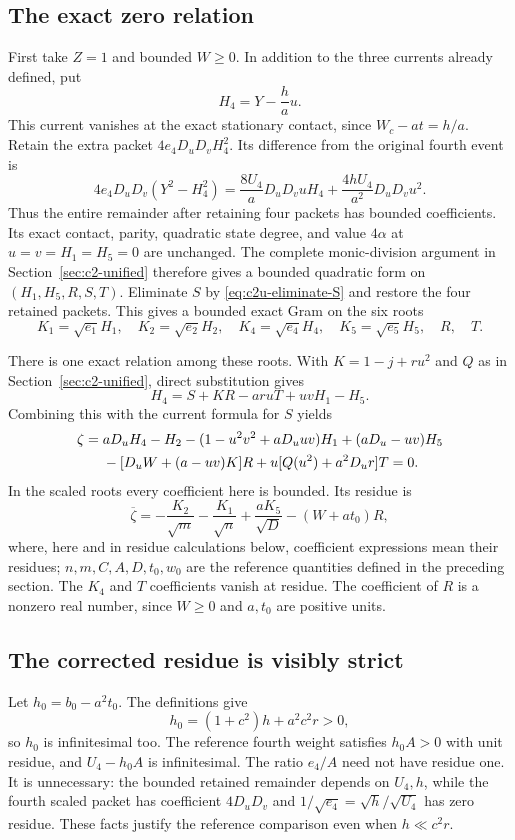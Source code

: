 \subsection{The exact zero relation}
First take $Z=1$ and bounded $W\geq0$.  In addition to the three currents
already defined, put
\[
H_4=Y-\frac ha u.
\]
This current vanishes at the exact stationary contact, since
$W_c-at=h/a$.  Retain the extra packet $4e_4D_uD_vH_4^2$.
Its difference from the original fourth event is
\[
4e_4D_uD_v(Y^2-H_4^2)
=\frac{8U_4}{a}D_uD_vuH_4+
\frac{4hU_4}{a^2}D_uD_vu^2.
\]
Thus the entire remainder after retaining four packets has bounded
coefficients.  Its exact contact, parity, quadratic state degree, and
value $4\alpha$ at $u=v=H_1=H_5=0$ are unchanged.  The complete
monic-division argument in Section~\ref{sec:c2-unified} therefore gives
a bounded quadratic form on $(H_1,H_5,R,S,T)$.  Eliminate $S$ by
\eqref{eq:c2u-eliminate-S} and restore the four retained packets.  This
gives a bounded exact Gram on the six roots
\begin{equation}
K_1=\sqrt{e_1}H_1,\quad K_2=\sqrt{e_2}H_2,\quad
K_4=\sqrt{e_4}H_4,\quad K_5=\sqrt{e_5}H_5,\quad R,\quad T.
\label{eq:c2y-roots}
\end{equation}

There is one exact relation among these roots.  With
$K=1-j+ru^2$ and $Q$ as in Section~\ref{sec:c2-unified}, direct
substitution gives
\[
H_4=S+KR-ar uT+uvH_1-H_5.
\]
Combining this with the current formula for $S$ yields
\begin{align}
\zeta={}&aD_uH_4-H_2-(1-u^2v^2+aD_uuv)H_1
 +(aD_u-uv)H_5\notag\\
&-[D_uW+(a-uv)K]R+u[Q(u^2)+a^2D_ur]T=0.
\label{eq:c2y-zero-relation}
\end{align}
In the scaled roots every coefficient here is bounded.  Its residue is
\begin{equation}
\overline\zeta=-\frac{K_2}{\sqrt m}-\frac{K_1}{\sqrt n}
+\frac{aK_5}{\sqrt D}-(W+at_0)R,
\label{eq:c2y-zero-residue}
\end{equation}
where, here and in residue calculations below, coefficient expressions
mean their residues; $n,m,C,A,D,t_0,w_0$ are the reference quantities
defined in the preceding section.  The $K_4$ and $T$ coefficients
vanish at residue.  The coefficient of $R$ is a nonzero real number,
since $W\geq0$ and $a,t_0$ are positive units.

\subsection{The corrected residue is visibly strict}
Let $h_0=b_0-a^2t_0$.  The definitions give
\begin{equation}
h_0=(1+c^2)h+a^2c^2r>0,
\label{eq:c2y-h0}
\end{equation}
so $h_0$ is infinitesimal too.  The reference fourth weight satisfies
$h_0A>0$ with unit residue, and $U_4-h_0A$ is infinitesimal.
The ratio $e_4/A$ need not have residue one.  It is unnecessary:
the bounded retained remainder depends on $U_4,h$, while the fourth
scaled packet has coefficient $4D_uD_v$ and
$1/\sqrt{e_4}=\sqrt h/\sqrt{U_4}$ has zero residue.  These facts
justify the reference comparison even when $h\ll c^2r$.

